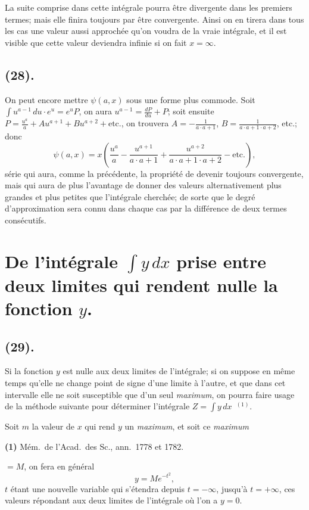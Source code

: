 \documentclass{article}
\begin{document}
La suite comprise dans cette intégrale pourra être divergente dans les premiers termes; mais elle finira toujours par être convergente. Ainsi on en tirera dans tous les cas une valeur aussi approchée qu'on voudra de la vraie intégrale, et il est visible que cette valeur deviendra infinie si on fait $x=\infty$.

\subsection*{(28).}

On peut encore mettre $\psi(a,x)$ sous une forme plus commode. Soit $\displaystyle\int u^{a-1}\,du\cdot e^{u}=e^{u}P$, on aura $u^{a-1}=\frac{dP}{du}+P$; soit ensuite $P=\frac{u^{a}}{a}+Au^{a+1}+Bu^{a+2}+\text{etc.}$, on trouvera $A=-\frac{1}{a\cdot a+1}$, $B=\frac{1}{a\cdot a+1\cdot a+2}$, etc.; donc
\[ \psi(a,x)=x\left(\frac{u^{a}}{a}-\frac{u^{a+1}}{a\cdot a+1}+\frac{u^{a+2}}{a\cdot a+1\cdot a+2}-\text{etc.}\right), \tag{5} \]
série qui aura, comme la précédente, la propriété de devenir toujours convergente, mais qui aura de plus l'avantage de donner des valeurs alternativement plus grandes et plus petites que l'intégrale cherchée; de sorte que le degré d'approximation sera connu dans chaque cas par la différence de deux termes consécutifs.

\section*{De l'intégrale $\displaystyle\int y\,dx$ prise entre deux limites qui rendent nulle la fonction $y$.}

\subsection*{(29).}

Si la fonction $y$ est nulle aux deux limites de l'intégrale; si on suppose en même temps qu'elle ne change point de signe d'une limite à l'autre, et que dans cet intervalle elle ne soit susceptible que d'un seul \emph{maximum}, on pourra faire usage de la méthode suivante pour déterminer l'intégrale $Z=\displaystyle\int y\,dx$~${}^{(1)}$.

Soit $m$ la valeur de $x$ qui rend $y$ un \emph{maximum}, et soit ce \emph{maximum}

\textbf{(1)} Mém.\ de l'Acad.\ des Sc., ann.\ 1778 et 1782.

$=M$, on fera en général
\[ y=Me^{-t^{2}}, \]
$t$ étant une nouvelle variable qui s'étendra depuis $t=-\infty$, jusqu'à $t=+\infty$, ces valeurs répondant aux deux limites de l'intégrale où l'on a $y=0$.
\end{document}
